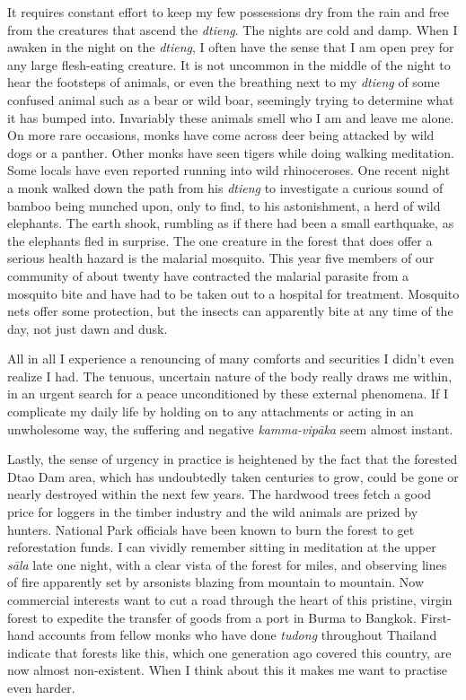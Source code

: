It requires constant effort to keep my few possessions dry from the rain
and free from the creatures that ascend the \emph{dtieng}. The nights
are cold and damp. When I awaken in the night on the \emph{dtieng}, I
often have the sense that I am open prey for any large flesh-eating
creature. It is not uncommon in the middle of the night to hear the
footsteps of animals, or even the breathing next to my \emph{dtieng} of
some confused animal such as a bear or wild boar, seemingly trying to
determine what it has bumped into. Invariably these animals smell who I
am and leave me alone. On more rare occasions, monks have come across
deer being attacked by wild dogs or a panther. Other monks have seen
tigers while doing walking meditation. Some locals have even reported
running into wild rhinoceroses. One recent night a monk walked down the
path from his \emph{dtieng} to investigate a curious sound of bamboo
being munched upon, only to find, to his astonishment, a herd of wild
elephants. The earth shook, rumbling as if there had been a small
earthquake, as the elephants fled in surprise. The one creature in the
forest that does offer a serious health hazard is the malarial mosquito. 
This year five members of our community of about twenty have contracted
the malarial parasite from a mosquito bite and have had to be taken out
to a hospital for treatment. Mosquito nets offer some protection, but
the insects can apparently bite at any time of the day, not just dawn
and dusk. 

All in all I experience a renouncing of many comforts and securities I
didn't even realize I had. The tenuous, uncertain nature of the body
really draws me within, in an urgent search for a peace unconditioned by
these external phenomena. If I complicate my daily life by holding on to
any attachments or acting in an unwholesome way, the suffering and
negative \emph{kamma-vipāka} seem almost instant. 

Lastly, the sense of urgency in practice is heightened by the fact that
the forested Dtao Dam area, which has undoubtedly taken centuries to
grow, could be gone or nearly destroyed within the next few years. The
hardwood trees fetch a good price for loggers in the timber industry and
the wild animals are prized by hunters. National Park officials have
been known to burn the forest to get reforestation funds. I can vividly
remember sitting in meditation at the upper \emph{sāla} late one night, 
with a clear vista of the forest for miles, and observing lines of fire
apparently set by arsonists blazing from mountain to mountain. Now
commercial interests want to cut a road through the heart of this
pristine, virgin forest to expedite the transfer of goods from a port in
Burma to Bangkok. First-hand accounts from fellow monks who have done
\emph{tudong} throughout Thailand indicate that forests like this, which
one generation ago covered this country, are now almost non-existent. 
When I think about this it makes me want to practise even harder. 


